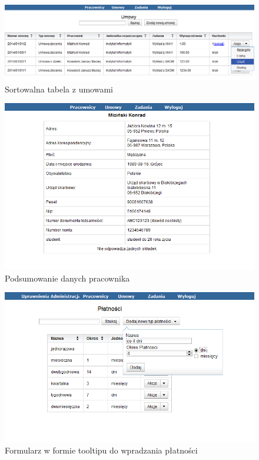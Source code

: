 \begin{figure}[]
    \begin{center}
	\includegraphics[scale=.8,angle=-90]{img/screen3.png}
	\caption{Sortowalna tabela z umowami}
	\label{screen3}
    \end{center}
\end{figure}

\begin{figure}[]
    \begin{center}
	\includegraphics[scale=1,angle=-90]{img/screen4.png}
	\caption{Podsumowanie danych pracownika}
	\label{screen4}
    \end{center}
\end{figure}

\begin{figure}[]
    \begin{center}
	\includegraphics[scale=1,angle=-90]{img/screen5.png}
	\caption{Formularz w formie tooltipu do wpradzania płatności}
	\label{screen5}
    \end{center}
\end{figure}
